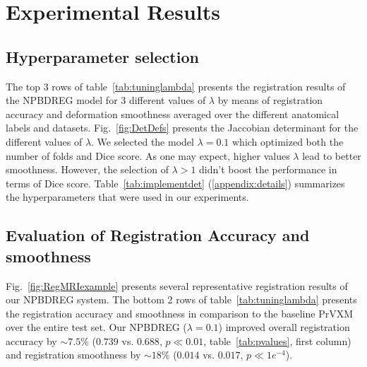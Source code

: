 \documentclass[preprint,authoryear]{elsarticle}
\begin{document}
\section{Experimental Results}\label{sec:expresults}
\subsection{Hyperparameter selection}
The top 3 rows of table~\ref{tab:tuninglambda} presents the registration results of the NPBDREG model for 3 different values of $\lambda$ by means of registration accuracy and deformation smoothness averaged over the different anatomical labels and datasets. 
Fig.~\ref{fig:DetDefs} presents the Jaccobian determinant for the different values of $\lambda$. 
We selected the model $\lambda=0.1$ which optimized both the number of folds and Dice score. As one may expect, higher values $\lambda$ lead to better smoothness. However, the selection of $\lambda>1$ didn't boost the performance in terms of Dice score. Table~\ref{tab:implementdet} (\ref{appendix:details}) summarizes  the hyperparameters that were used in our experiments.

\subsection{Evaluation of Registration Accuracy and smoothness}
Fig.~\ref{fig:RegMRIexample} presents several representative registration results of our NPBDREG system.
The bottom 2  rows of table~\ref{tab:tuninglambda} presents the registration accuracy and smoothness in comparison to the baseline PrVXM \cite{dalca2018varreg} over the entire test set. Our NPBDREG ($\lambda=0.1$) improved overall registration accuracy by $\sim7.5\%$ ($0.739$ vs. $0.688$, $p \ll 0.01$, table~\ref{tab:pvalues}, first column) and registration smoothness by $\sim18\%$ ($0.014$ vs. $0.017$, $p\ll 1e^{-4}$).
\end{document}
